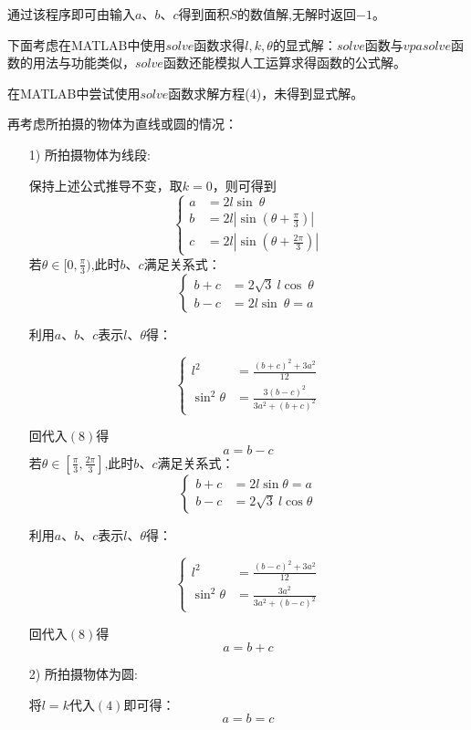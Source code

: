 \documentclass[a4paper,10.5pt]{ctexart}
\begin{document}
\par 通过该程序即可由输入$a$、$b$、$c$得到面积$S$的数值解,无解时返回$-1$。
\par 下面考虑在MATLAB中使用$solve$函数求得$l,k,\theta$的显式解：$solve$函数与$vpasolve$函数的用法与功能类似，$solve$函数还能模拟人工运算求得函数的公式解。
\par 在MATLAB中尝试使用$solve$函数求解方程(4)，未得到显式解。
~\\
\par 再考虑所拍摄的物体为直线或圆的情况：
\begin{itemize}
  \item [1)] 所拍摄物体为线段:    
\par 保持上述公式推导不变，取$k=0$，则可得到
\begin{equation}
\left\{
\begin{aligned}
a&=2l\sin\ \theta\\
b&=2l|\sin(\theta+\frac{\pi}{3})|\\
c&=2l|\sin(\theta+\frac{2\pi}{3})|
\end{aligned}
\right.
\end{equation}
若$\theta\in[0,\frac{\pi}{3})$,此时$b$、$c$满足关系式：
\begin{equation}
\nonumber
\left\{
\begin{aligned}
b+c&=2\sqrt{3}\ l\cos\ \theta\\
b-c&=2l\sin\ \theta=a
\end{aligned}
\right.
\end{equation}
\par 利用$a$、$b$、$c$表示$l$、$\theta$得：

\begin{equation}
\nonumber
\left\{
\begin{aligned}
l^2&=\frac{(b+c)^2+3a^2}{12}\\
\sin^2\theta&=\frac{3(b-c)^2}{3a^2+(b+c)^2}
\end{aligned}
\right.
\end{equation}
\par 回代入$(8)$得$$a=b-c$$
若$\theta\in[\frac{\pi}{3},\frac{2\pi}{3}]$,此时$b$、$c$满足关系式：
\begin{equation}
\nonumber
\left\{
\begin{aligned}
b+c&=2l\sin\theta=a\\
b-c&=2\sqrt{3}\ l\cos\theta
\end{aligned}
\right.
\end{equation}
\par 利用$a$、$b$、$c$表示$l$、$\theta$得：

\begin{equation}
\nonumber
\left\{
\begin{aligned}
l^2&=\frac{(b-c)^2+3a^2}{12}\\
\sin^2\theta&=\frac{3a^2}{3a^2+(b-c)^2}
\end{aligned}
\right.
\end{equation}
\par 回代入$(8)$得$$a=b+c$$
  \item [2)] 所拍摄物体为圆:
\par 将$l=k$代入$(4)$即可得：$$a=b=c$$
\end{itemize}
\end{document}
